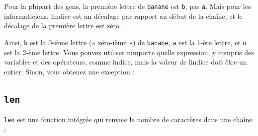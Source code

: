 Pour la plupart des gens, la première lettre de
\texttt{\textquotesingle{}banane\textquotesingle{}} est \texttt{b}, pas
\texttt{a}. Mais pour les informaticiens, l\textquotesingle indice est
un décalage par rapport au début de la chaîne, et le décalage de la
première lettre est zéro.

\begin{Shaded}
\begin{Highlighting}[]
\OperatorTok{\textgreater{}\textgreater{}\textgreater{}}\OperatorTok{=}\NormalTok{ fruit[}\NormalTok{]}
\OperatorTok{\textgreater{}\textgreater{}\textgreater{}}
\end{Highlighting}
\end{Shaded}

Ainsi, \texttt{b} est la 0-ième lettre (« zéro-ième ») de
\texttt{\textquotesingle{}banane\textquotesingle{}}, \texttt{a} est la
1-ère lettre, et \texttt{n} est la 2-ème lettre. Vous pouvez utiliser
n\textquotesingle importe quelle expression, y compris des variables et
des opérateurs, comme indice, mais la valeur de l\textquotesingle indice
doit être un entier. Sinon, vous obtenez une exception :

\begin{Shaded}
\begin{Highlighting}[]
\OperatorTok{\textgreater{}\textgreater{}\textgreater{}}\OperatorTok{=}\NormalTok{ fruit[}\NormalTok{]}
\end{Highlighting}
\end{Shaded}

\hypertarget{len}{%
\subsection{\texorpdfstring{\texttt{len}}{len}}\label{len}}

\texttt{len} est une fonction intégrée qui renvoie le nombre de
caractères dans une chaîne :

\begin{Shaded}
\begin{Highlighting}[]
\OperatorTok{\textgreater{}\textgreater{}\textgreater{}}\OperatorTok{=} 
\OperatorTok{\textgreater{}\textgreater{}\textgreater{}} 
\end{Highlighting}
\end{Shaded}

